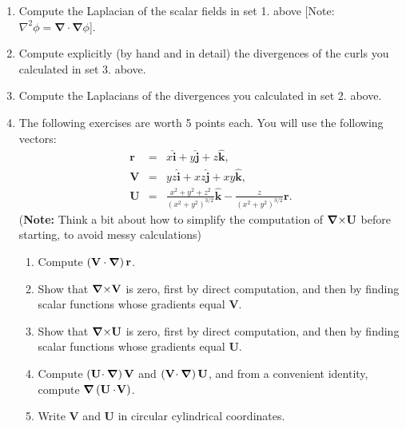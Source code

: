 \documentclass[fleqn]{article}
\newcommand{\grad}[1]{\mbox{\boldmath $\nabla$}\mbox{$#1$}}
\begin{document}
\begin{enumerate}
    \item Compute the Laplacian of the scalar fields in set 1. above [Note: $\nabla ^{2}\phi =\mathbf{\nabla \cdot \nabla }\phi $].
    
    \item Compute explicitly (by hand and in detail) the divergences of the curls you calculated in set 3. above.   
    
    \item Compute the Laplacians of the divergences you calculated in set 2. above.
    
    
    \item The following exercises are worth 5 points each. You will use the following vectors: 
      \begin{eqnarray*}
      \mathbf{r} &=&x\mathbf{\hat{i}}+y\mathbf{\hat{j}}+z\mathbf{\hat{k},} \\
      \mathbf{V} &=&yz\mathbf{\hat{i}}+xz\mathbf{\hat{j}}+xy\mathbf{\hat{k},} \\
      \mathbf{U} &=&\frac{x^{2}+y^{2}+z^{2}}{\left( x^{2}+y^{2}\right) ^{3/2}}
      \mathbf{\hat{k}-}\frac{z}{\left( x^{2}+y^{2}\right) ^{3/2}}\mathbf{r.}
      \end{eqnarray*}
    ({\bf Note:} Think a bit about how to simplify the computation of
    $\mathbf{\grad \times U}$ before starting, to avoid messy calculations)
    \begin{enumerate}
    \item Compute $\left( \mathbf{V\cdot \grad{}}\right) \mathbf{r}$.
    
    \item Show that $\mathbf{\grad \times V}$ is zero, first by direct computation, and then by finding scalar functions whose gradients equal $\mathbf{V}$.
    
    \item Show that $\mathbf{\grad \times U}$ is zero, first by direct computation, and then by finding scalar functions whose gradients equal $\mathbf{U}$. 
    
    \item Compute $\left( \mathbf{U \! \cdot \grad{} }\right) \mathbf{V}$ and $\left( \mathbf{V \! \cdot \grad{} }\right) \mathbf{U}$, and from a
    convenient identity, compute $\grad{}\left( \mathbf{U\cdot
    \! V}\right) $.
    
    \item Write $\mathbf{V}$ and $\mathbf{U}$ in circular cylindrical
    coordinates.
    \end{enumerate}
    

\end{enumerate}
\end{document}
